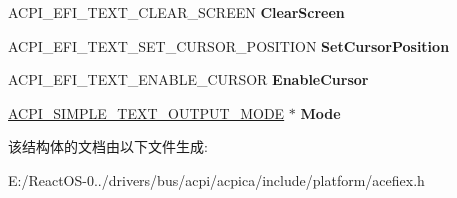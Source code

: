 \begin{DoxyCompactItemize}
A\+C\+P\+I\+\_\+\+E\+F\+I\+\_\+\+T\+E\+X\+T\+\_\+\+C\+L\+E\+A\+R\+\_\+\+S\+C\+R\+E\+EN {\bfseries Clear\+Screen}
\item 
\mbox{\label{struct___a_c_p_i___s_i_m_p_l_e___t_e_x_t___o_u_t_p_u_t___i_n_t_e_r_f_a_c_e_a164e2ef530b3e0ef14145d7ecd24b5e1}} 
A\+C\+P\+I\+\_\+\+E\+F\+I\+\_\+\+T\+E\+X\+T\+\_\+\+S\+E\+T\+\_\+\+C\+U\+R\+S\+O\+R\+\_\+\+P\+O\+S\+I\+T\+I\+ON {\bfseries Set\+Cursor\+Position}
\item 
\mbox{\label{struct___a_c_p_i___s_i_m_p_l_e___t_e_x_t___o_u_t_p_u_t___i_n_t_e_r_f_a_c_e_a4064fbe640abdd9334100360005b902c}} 
A\+C\+P\+I\+\_\+\+E\+F\+I\+\_\+\+T\+E\+X\+T\+\_\+\+E\+N\+A\+B\+L\+E\+\_\+\+C\+U\+R\+S\+OR {\bfseries Enable\+Cursor}
\item 
\mbox{\label{struct___a_c_p_i___s_i_m_p_l_e___t_e_x_t___o_u_t_p_u_t___i_n_t_e_r_f_a_c_e_a01af4a08fb8081018a07adb2b1b10696}} 
\hyperlink{struct_a_c_p_i___s_i_m_p_l_e___t_e_x_t___o_u_t_p_u_t___m_o_d_e}{A\+C\+P\+I\+\_\+\+S\+I\+M\+P\+L\+E\+\_\+\+T\+E\+X\+T\+\_\+\+O\+U\+T\+P\+U\+T\+\_\+\+M\+O\+DE} $\ast$ {\bfseries Mode}
\end{DoxyCompactItemize}


该结构体的文档由以下文件生成\+:\begin{DoxyCompactItemize}
\item 
E\+:/\+React\+O\+S-\/0../drivers/bus/acpi/acpica/include/platform/acefiex.\+h\end{DoxyCompactItemize}
